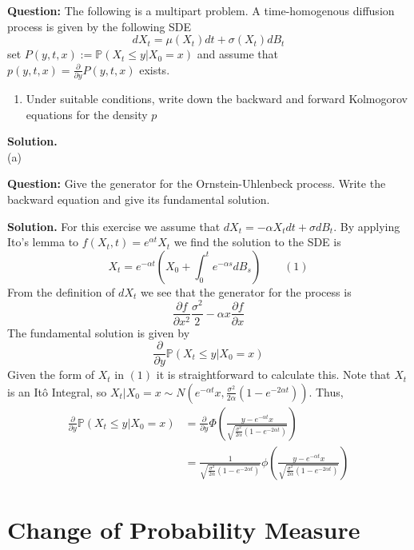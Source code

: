 \documentclass{article}
\begin{document}
\begin{tcolorbox}[colframe=black,colback=gray!5,boxrule=0.5pt]
\textbf{Question:} The following is a multipart problem. A time-homogenous diffusion process is given by the following SDE 
$$dX_t = \mu(X_t)dt + \sigma(X_t)dB_t$$
set $P(y,t,x) := \mathbb{P}(X_t\leq y|X_0=x)$ and assume that $p(y,t,x)=\frac{\partial}{\partial y}P(y,t,x)$ exists.
\begin{enumerate}[label=(\alph*)]
    \item Under suitable conditions, write down the backward and forward Kolmogorov equations for the density $p$
\end{enumerate}
\end{tcolorbox}
\textbf{Solution.} \\
(a) 

\begin{tcolorbox}[colframe=black,colback=gray!5,boxrule=0.5pt]
\textbf{Question:} Give the generator for the Ornstein-Uhlenbeck process. Write the backward equation and give its fundamental solution.
\end{tcolorbox}
\textbf{Solution.} For this exercise we assume that $dX_t = -\alpha X_tdt + \sigma dB_t$. By applying Ito's lemma to $f(X_t,t)= e^{\alpha t}X_t$ we find the solution to the SDE is 
$$X_t = e^{-\alpha t}\left(X_0 + \int_0^te^{-\alpha s}dB_s\right)\quad\quad(1)$$
From the definition of $dX_t$ we see that the generator for the process is
$$\frac{\partial f}{\partial x^2}\frac{\sigma^2}{2} - \alpha x\frac{\partial f}{\partial x}$$
The fundamental solution is given by 
$$\frac{\partial}{\partial y}\mathbb{P}(X_t\leq y | X_0=x)$$
Given the form of $X_t$ in $(1)$ it is straightforward to calculate this. Note that $X_t$ is an Itô Integral, so $X_t | X_0=x\sim N(e^{-\alpha t}x, \frac{\sigma^2}{2\alpha}(1-e^{-2\alpha t}))$. Thus, 
\begin{align*}
    \frac{\partial}{\partial y}\mathbb{P}(X_t\leq y | X_0=x) &= \frac{\partial}{\partial y}\Phi\left(\frac{y-e^{-\alpha t}x}{\sqrt{\frac{\sigma^2}{2\alpha}(1-e^{-2\alpha t})}}\right) \\
    &= \frac{1}{\sqrt{\frac{\sigma^2}{2\alpha}(1-e^{-2\alpha t})}}\phi\left(\frac{y-e^{-\alpha t}x}{\sqrt{\frac{\sigma^2}{2\alpha}(1-e^{-2\alpha t})}}\right)
\end{align*}


\newpage
\section{Change of Probability Measure}
\end{document}
